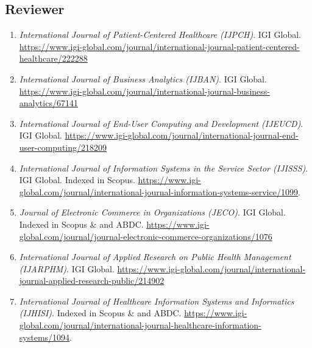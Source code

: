 \documentclass[10pt]{article}
\begin{document}
\subsection{Reviewer}

\begin{enumerate}
\item \emph{International Journal of Patient-Centered Healthcare (IJPCH)}. IGI Global. \url{https://www.igi-global.com/journal/international-journal-patient-centered-healthcare/222288}

\item \emph{International Journal of Business Analytics (IJBAN)}. IGI Global. \url{https://www.igi-global.com/journal/international-journal-business-analytics/67141}

\item \emph{International Journal of End-User Computing and Development (IJEUCD)}. IGI Global. \url{https://www.igi-global.com/journal/international-journal-end-user-computing/218209}

\item \emph{International Journal of Information Systems in the Service Sector (IJISSS)}. IGI Global. Indexed in Scopus. \url{https://www.igi-global.com/journal/international-journal-information-systems-service/1099}. 

\item \emph{Journal of Electronic Commerce in Organizations (JECO)}. IGI Global. Indexed in Scopus \& and ABDC. \url{https://www.igi-global.com/journal/journal-electronic-commerce-organizations/1076}

\item \emph{International Journal of Applied Research on Public Health Management (IJARPHM)}. IGI Global. \url{https://www.igi-global.com/journal/international-journal-applied-research-public/214902}

\item \emph{International Journal of Healthcare Information Systems and Informatics (IJHISI)}. Indexed in Scopus \& and ABDC. \url{https://www.igi-global.com/journal/international-journal-healthcare-information-systems/1094}. 

\end{enumerate}
\end{document}
